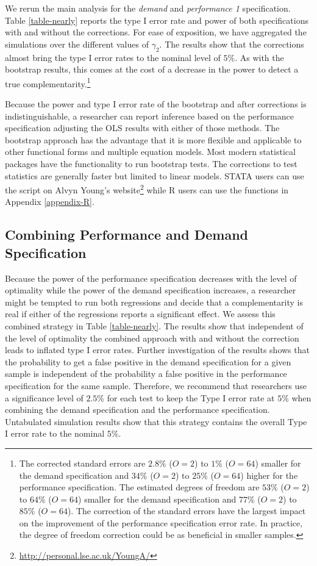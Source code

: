 \documentclass[12pt]{article}
\begin{document}
We rerun the main analysis for the \emph{demand} and \emph{performance 1} specification. Table \ref{table-nearly} reports the type I error rate and power of both specifications with and without the corrections. For ease of exposition, we have aggregated the simulations over the different values of $\gamma_2$. The results show that the corrections almost bring the type I error rates to the nominal level of $5\%$. As with the bootstrap results, this comes at the cost of a decrease in the power to detect a true complementarity.\footnote{The corrected standard errors are $2.8\%$ ($O = 2$) to $1\%$ ($O = 64$) smaller for the demand specification and $34\%$ ($O = 2$) to $25\%$ ($O = 64$) higher for the performance specification. The estimated degrees of freedom are $53\%$ ($O = 2$) to $64\%$ ($O = 64$) smaller for the demand specification and $77\%$ ($O = 2$) to $85\%$ ($O = 64$). The correction of the standard errors have the largest impact on the improvement of the performance specification error rate. In practice, the degree of freedom correction could be as beneficial in smaller samples.}



Because the power and type I error rate of the bootstrap and after corrections is indistinguishable, a researcher can report inference based on the performance specification adjusting the OLS results with either of those methods. The bootstrap approach has the advantage that it is more flexible and applicable to other functional forms and multiple equation models. Most modern statistical packages have the functionality to run bootstrap tests. The corrections to test statistics are generally faster but limited to linear models. STATA users can use the script on Alvyn Young's website\footnote{\url{http://personal.lse.ac.uk/YoungA/}} while R users can use the functions in Appendix \ref{appendix-R}.

\subsection{Combining Performance and Demand Specification}

Because the power of the performance specification decreases with the level of optimality while the power of the demand specification increases, a researcher might be tempted to run both regressions and decide that a complementarity is real if either of the regressions reports a significant effect. We assess this combined strategy in Table \ref{table-nearly}. The results show that independent of the level of optimality the combined approach with and without the correction leads to inflated type I error rates. Further investigation of the results shows that the probability to get a false positive in the demand specification for a given sample is independent of the probability a false positive in the performance specification for the same sample.  Therefore, we recommend that researchers use a significance level of $2.5\%$ for each test to keep the Type I error rate at $5\%$ when combining the demand specification and the performance specification. Untabulated simulation results show that this strategy contains the overall Type I error rate to the nominal $5\%$.
\end{document}
